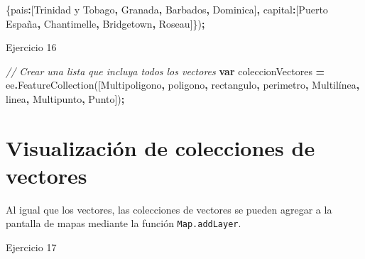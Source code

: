 \documentclass[
  12pt,
  letterpaper,
  twoside]{book}
\newenvironment{Shaded}{\begin{snugshade}}{\end{snugshade}}
\newcommand{\CommentTok}[1]{\textcolor[rgb]{0.56,0.35,0.01}{\textit{#1}}}
\newcommand{\DataTypeTok}[1]{\textcolor[rgb]{0.13,0.29,0.53}{#1}}
\newcommand{\FunctionTok}[1]{\textcolor[rgb]{0.00,0.00,0.00}{#1}}
\newcommand{\KeywordTok}[1]{\textcolor[rgb]{0.13,0.29,0.53}{\textbf{#1}}}
\newcommand{\NormalTok}[1]{#1}
\newcommand{\OperatorTok}[1]{\textcolor[rgb]{0.81,0.36,0.00}{\textbf{#1}}}
\newcommand{\StringTok}[1]{\textcolor[rgb]{0.31,0.60,0.02}{#1}}
\begin{document}
\begin{Shaded}
\begin{Highlighting}[]
\NormalTok{        \{}\DataTypeTok{pais}\OperatorTok{:}\NormalTok{[}\StringTok{\textquotesingle{}Trinidad y Tobago\textquotesingle{}}\OperatorTok{,}
            \StringTok{\textquotesingle{}Granada\textquotesingle{}}\OperatorTok{,}
            \StringTok{\textquotesingle{}Barbados\textquotesingle{}}\OperatorTok{,}
            \StringTok{\textquotesingle{}Dominica\textquotesingle{}}\NormalTok{]}\OperatorTok{,}
        \DataTypeTok{capital}\OperatorTok{:}\NormalTok{[}\StringTok{\textquotesingle{}Puerto España\textquotesingle{}}\OperatorTok{,}
              \StringTok{\textquotesingle{}Chantimelle\textquotesingle{}}\OperatorTok{,}
              \StringTok{\textquotesingle{}Bridgetown\textquotesingle{}}\OperatorTok{,}
              \StringTok{\textquotesingle{}Roseau\textquotesingle{}}\NormalTok{]\})}\OperatorTok{;}
\end{Highlighting}
\end{Shaded}

Ejercicio 16

\begin{Shaded}
\begin{Highlighting}[]
\CommentTok{// Crear una lista que incluya todos los vectores}
\KeywordTok{var}\NormalTok{ coleccionVectores }\OperatorTok{=}\NormalTok{ ee}\OperatorTok{.}\FunctionTok{FeatureCollection}\NormalTok{([Multipoligono}\OperatorTok{,}
\NormalTok{  poligono}\OperatorTok{,}
\NormalTok{  rectangulo}\OperatorTok{,}
\NormalTok{  perimetro}\OperatorTok{,}
\NormalTok{  Multilínea}\OperatorTok{,}
\NormalTok{  linea}\OperatorTok{,}
\NormalTok{  Multipunto}\OperatorTok{,}
\NormalTok{  Punto])}\OperatorTok{;}
\end{Highlighting}
\end{Shaded}

\hypertarget{visualizaciuxf3n-de-colecciones-de-vectores}{%
\section{Visualización de colecciones de vectores}\label{visualizaciuxf3n-de-colecciones-de-vectores}}

Al igual que los vectores, las colecciones de vectores se pueden agregar a la pantalla de mapas mediante la función \texttt{Map.addLayer}.

Ejercicio 17
\end{document}
